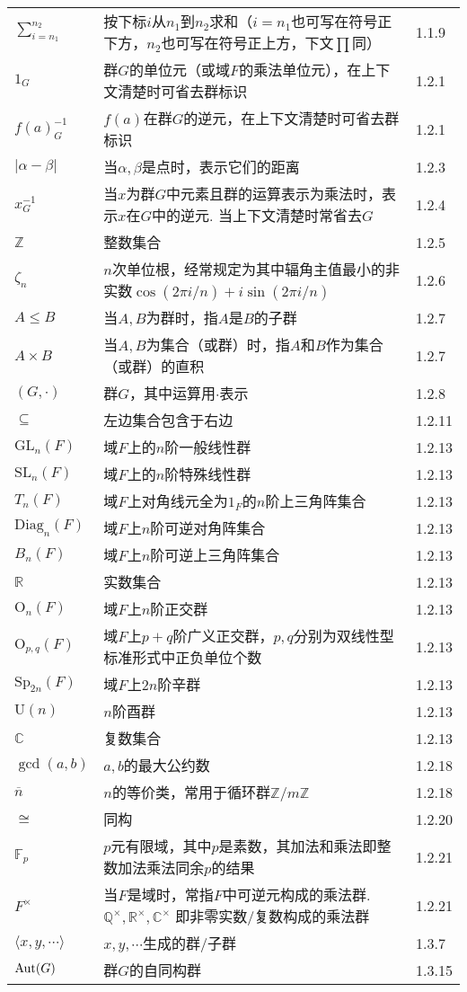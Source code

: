 \begin{longtable}{lp{.6\linewidth}l}
	$\sum_{i=n_1}^{n_2}$ & 按下标$i$从$n_1$到$n_2$求和（$i=n_1$也可写在符号正下方，$n_2$也可写在符号正上方，下文$\prod$同）& 1.1.9\\
	$1_G$ & 群$G$的单位元（或域$F$的乘法单位元），在上下文清楚时可省去群标识 & 1.2.1\\
	$f(a)_G^{-1}$ & $f(a)$在群$G$的逆元，在上下文清楚时可省去群标识 & 1.2.1\\
	$|\alpha-\beta|$ & 当$\alpha,\beta$是点时，表示它们的距离 & 1.2.3\\
	$x^{-1}_G$ & 当$x$为群$G$中元素且群的运算表示为乘法时，表示$x$在$G$中的逆元. 当上下文清楚时常省去$G$ & 1.2.4\\
	$\mathbb{Z}$ & 整数集合 & 1.2.5\\
	$\zeta_n$ & $n$次单位根，经常规定为其中辐角主值最小的非实数$\cos(2\pi i/n)+i\sin(2\pi i/n)$ & 1.2.6\\
	$A\leq B$ & 当$A,B$为群时，指$A$是$B$的子群 & 1.2.7\\
	$A\times B$ & 当$A,B$为集合（或群）时，指$A$和$B$作为集合（或群）的直积 & 1.2.7\\
	$(G, \cdot)$ & 群$G$，其中运算用$\cdot$表示 & 1.2.8\\
	$\subseteq$ & 左边集合包含于右边 & 1.2.11\\
	$\mathrm{GL}_n(F)$ & 域$F$上的$n$阶一般线性群 & 1.2.13\\
	$\mathrm{SL}_n(F)$ & 域$F$上的$n$阶特殊线性群 & 1.2.13\\
	$T_n(F)$ & 域$F$上对角线元全为$1_F$的$n$阶上三角阵集合 & 1.2.13\\
	$\mathrm{Diag}_n(F)$ & 域$F$上$n$阶可逆对角阵集合 & 1.2.13\\
	$B_n(F)$ & 域$F$上$n$阶可逆上三角阵集合 & 1.2.13\\
	$\mathbb{R}$ & 实数集合 & 1.2.13\\
	$\mathrm{O}_n(F)$ & 域$F$上$n$阶正交群 & 1.2.13\\
	$\mathrm{O}_{p,q}(F)$ & 域$F$上$p+q$阶广义正交群，$p,q$分别为双线性型标准形式中正负单位个数 & 1.2.13\\
	$\mathrm{Sp}_{2n}(F)$ & 域$F$上$2n$阶辛群 & 1.2.13\\
	$\mathrm{U}(n)$ & $n$阶酉群 & 1.2.13\\
	$\mathbb{C}$ & 复数集合 & 1.2.13\\
	$\gcd(a,b)$ & $a,b$的最大公约数 & 1.2.18\\
	$\overline{n}$ & $n$的等价类，常用于循环群$\mathbb{Z}/m\mathbb{Z}$ & 1.2.18\\
	$\cong$ & 同构 & 1.2.20\\
	$\mathbb{F}_p$ & $p$元有限域，其中$p$是素数，其加法和乘法即整数加法乘法同余$p$的结果 & 1.2.21\\
	$F^{\times}$ & 当$F$是域时，常指$F$中可逆元构成的乘法群. $\mathbb{Q}^{\times}, \mathbb{R}^{\times}, \mathbb{C}^{\times}$ 即非零实数/复数构成的乘法群 & 1.2.21\\
	$\langle x,y,\cdots \rangle$ & $x,y,\cdots$生成的群/子群 & 1.3.7\\
	$\operatorname{Aut}(G)$ & 群$G$的自同构群 & 1.3.15\\
\end{longtable}
